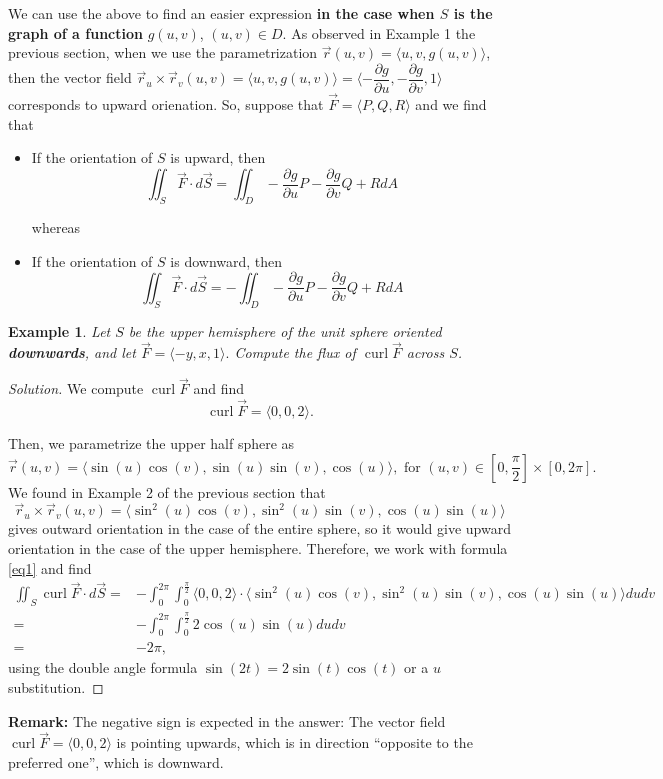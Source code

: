 \documentclass[12pt]{article}
\newcommand{\p}{\partial}
\newcommand{\vr}{\vec{r}{}}
\newcommand{\vF}{\vec{F}}
\renewcommand{\lg}{\langle}
\newcommand{\rg}{\rangle}
\DeclareMathOperator{\curl}{curl}
\newcommand{\vS}{\vec{S}}
\newcommand{\rcross}{\vr_u\times\vr_v}
\newenvironment{solution}
  {\begin{proof}[Solution]}
  {\end{proof}
  
  }
\newtheorem{example}{Example}
\begin{document}
We can use the above to find an easier expression \textbf{in the case when $S$ is the graph of a function} $g(u,v)$, $(u,v)\in D$. As observed in Example 1 the previous section, when we use the parametrization $\vr(u,v)=\lg u,v,g(u,v)\rg$, then the vector field $\rcross(u,v)=\lg u,v,g(u,v)\rg=\lg -\dfrac{\p g}{\p u},-\dfrac{\p g}{\p v},1\rg$ corresponds to upward orienation. So, suppose that $\vF=\lg P,Q,R\rg$ and we find that
\begin{itemize}
\item If the orientation of $S$ is upward, then $$\iint_S \vF\cdot d\vS=\iint_D-\dfrac{\p g}{\p u}P-\dfrac{\p g}{\p v}Q+R dA$$

whereas

\item If the orientation of $S$ is downward, then $$\iint_S \vF\cdot d\vS=-\iint_D-\dfrac{\p g}{\p u}P-\dfrac{\p g}{\p v}Q+R dA$$
\end{itemize}

\begin{example}

Let $S$ be the upper hemisphere of the unit sphere oriented \textbf{downwards}, and let $\vF=\lg -y,x,1\rg.$ Compute the flux of $\curl\vF $ across $S$.
\end{example}
\begin{solution}
We compute $\curl \vF$ and find $$\curl\vF=\lg 0, 0 ,2\rg.$$ 

Then, we parametrize the upper half sphere as $$\vr(u,v)=\lg \sin(u)\cos(v),\sin(u)\sin(v),\cos(u)\rg,\text{ for }(u,v)\in[0,\frac{\pi}{2}]\times[0,2\pi].$$ We found in Example 2 of the previous section that $$\rcross(u,v)=\lg\sin^2(u)\cos(v),\sin^2(u)\sin(v),\cos(u)\sin(u)\rg$$ gives outward orientation in the case of the entire sphere, so it would give upward orientation in the case of the upper hemisphere. Therefore, we work with formula \eqref{eq1} and find \begin{align*}
\iint_S \curl\vF\cdot d\vS=&-\int_0^{2\pi}\int_0^{\frac{\pi}{2}}\lg 0, 0 ,2\rg\cdot \lg\sin^2(u)\cos(v),\sin^2(u)\sin(v),\cos(u)\sin(u)\rg du dv\\
=&-\int_0^{2\pi}\int_0^{\frac{\pi}{2}}2\cos(u)\sin(u)du dv\\
=&-2\pi,
\end{align*}
using the double angle formula $\sin(2t)=2\sin(t)\cos(t) $ or a $u$ substitution.
\end{solution}

\textbf{Remark:} The negative sign is expected in the answer: The vector field $\curl\vF=\lg 0,0,2\rg$ is pointing upwards, which is in direction ``opposite to the preferred one'', which is downward.
\end{document}
